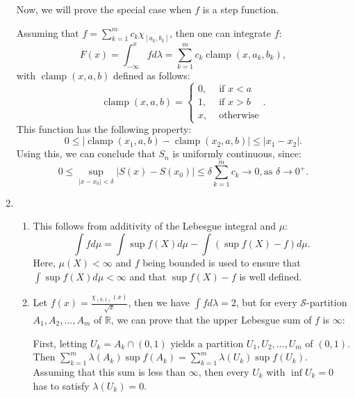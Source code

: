 \begin{enumerate}[label=\textbf{3B.\arabic*}]
    Now, we will prove the special case when \( f \) is a step function.

    Assuming that \( f = \sum_{k = 1}^{m} c_{k}\chi_{[a_{k},
    b_{k}]} \), then one can integrate \( f \):
    \[
      F(x)= \int _{-\infty}^{x}fd\lambda = \sum_{k = 1}^{m} c_{k}
      \operatorname{clamp}(x, a_{k}, b_{k})
    ,\] with \( \operatorname{clamp}(x, a, b) \) defined as follows:
    \[
      \operatorname{clamp}(x, a, b) = \begin{cases}
        0, &\text{ if }x < a\\
        1, &\text{ if }x > b\\
        x, &\text{ otherwise}
      \end{cases}
    .\]
    This function has the following property:
    \[
      0\le |\operatorname{clamp}(x_{1}, a, b) - \operatorname{clamp}(x_{2}, a, b)|
      \le |x_{1}-x_{2}|
    .\] 
    Using this, we can conclude that \( S_{n} \) is uniformly continuous, since:
    \[
      0 \le \sup _{|x-x_{0}| < \delta} |S(x)-S(x_{0})| \le \delta
      \sum_{k = 1}^{m} c_{k} \to 0, \text{as } \delta \to
      0^{+}
    .\] 
  \item \begin{enumerate}[label=(\alph*)]
    \item
    This follows from additivity of the Lebesgue integral and \( \mu  \):
    \[
      \int fd\mu = \int \sup f(X)d\mu - \int (\sup f(X) - f)d\mu
    .\] Here, \( \mu (X) < \infty \) and \( f \) being bounded is used to ensure
    that \( \int \sup f(X)d\mu < \infty \) and that \( \sup f(X) - f \) is well
    defined.
    \item
      Let \( f(x) = \frac{\chi_{(0, 1)}(x)}{\sqrt{x} } \), then we have \( \int
      fd\lambda = 2 \), but for every \( \mathcal{S} \)-partition \( A_{1},
      A_{2}, \ldots , A_{m} \) of \( \mathbb{R} \), we can prove that the upper
      Lebesgue sum of \( f \) is \( \infty \):

      First, letting \( U_{k} = A_{k} \cap (0, 1) \) yields a partition \( U_{1},
      U_{2}, \ldots , U_{m}\) of \( (0, 1) \). Then \( \sum_{k = 1}^{m} \lambda
      (A_{k}) \sup f(A_{k}) = \sum_{k = 1}^{m} \lambda(U_{k}) \sup f(U_{k}) \).
      Assuming that this sum is less than \( \infty \), then every \( U_{k} \)
      with \( \inf U_{k} = 0 \) has to satisfy \( \lambda(U_{k}) = 0 \).


\end{enumerate}
\end{enumerate}
